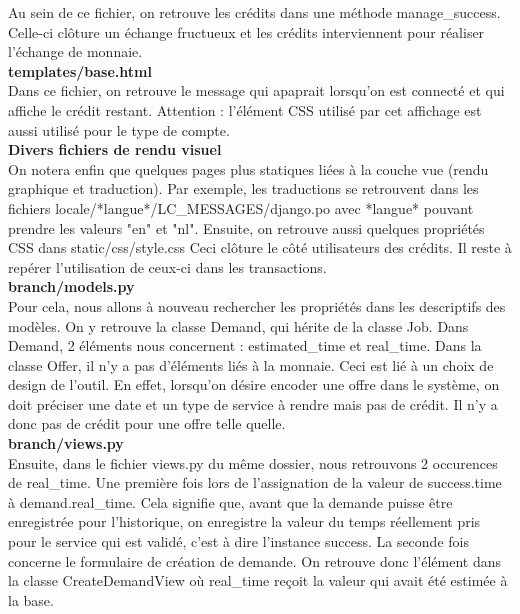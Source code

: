 Au sein de ce fichier,   on retrouve les crédits dans une méthode manage\_success.  Celle-ci clôture un échange fructueux et les crédits interviennent pour réaliser l'échange de monnaie.  
\\
\textbf{templates/base.html}
\\%
Dans ce fichier,  on retrouve le message qui apaprait lorsqu'on est connecté et qui affiche le crédit restant.  Attention : l'élément CSS utilisé par cet affichage est aussi utilisé pour le type de compte.   
\\
\textbf{Divers fichiers de rendu visuel}
\\%
On notera enfin que quelques pages plus statiques liées à la couche vue (rendu graphique et traduction).  Par exemple,  les traductions se retrouvent dans les fichiers locale/*langue*/LC\_MESSAGES/django.po avec *langue* pouvant prendre les valeurs "en" et "nl".  Ensuite,  on retrouve aussi quelques propriétés CSS dans static/css/style.css 
\newline
Ceci clôture le côté utilisateurs des crédits.  Il reste à repérer l'utilisation de ceux-ci dans les transactions.  
\\
\textbf{branch/models.py}
\\%
Pour cela,  nous allons à nouveau rechercher les propriétés dans les descriptifs des modèles. 
On y retrouve la classe Demand,  qui hérite de la classe Job.  Dans Demand,  2 éléments nous concernent : estimated\_time et real\_time.  
Dans la classe Offer,  il n'y a pas d'éléments liés à la monnaie.  Ceci est lié à un choix de design de l'outil.  En effet,   lorsqu'on désire encoder une offre dans le système,  on doit préciser une date et un type de service à rendre mais pas de crédit.  Il n'y a donc pas de crédit pour une offre telle quelle.
\\
\textbf{branch/views.py}
\\%
Ensuite,  dans le fichier views.py du même dossier,   nous retrouvons 2 occurences de real\_time.  
Une première fois lors de l'assignation de la valeur de success.time à demand.real\_time.  Cela signifie que,  avant que la demande puisse être enregistrée pour l'historique,  on enregistre la valeur du temps réellement pris pour le service qui est validé,  c'est à dire l'instance success.
La seconde fois concerne le formulaire de création de demande.  On retrouve donc l'élément dans la classe CreateDemandView où real\_time reçoit la valeur qui avait été estimée à la base.  
\\

